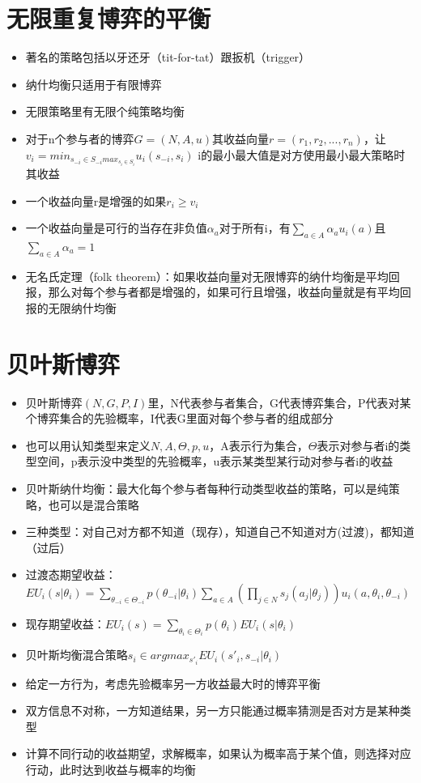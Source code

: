 \documentclass[]{book}
\providecommand{\tightlist}{%
  \setlength{\itemsep}{0pt}\setlength{\parskip}{0pt}}
\begin{document}
\section{无限重复博弈的平衡}

\begin{itemize}
\tightlist
\item
  著名的策略包括以牙还牙（tit-for-tat）跟扳机（trigger）
\item
  纳什均衡只适用于有限博弈
\item
  无限策略里有无限个纯策略均衡
\item
  对于n个参与者的博弈\(G = (N,A,u)\)其收益向量\(r = (r_1,r_2,...,r_n)\)，让\(v_i = min_{s_{-i} \in S_{-i}max_{s_i \in S_i}} u_i(s_{-i},s_i)\) i的最小最大值是对方使用最小最大策略时其收益
\item
  一个收益向量r是增强的如果\(r_i\geq v_i\)
\item
  一个收益向量是可行的当存在非负值\(\alpha_a\)对于所有i，有\(\sum_{a\in A}\alpha_au_i(a)\)且\(\sum_{a\in A}\alpha_a = 1\)
\item
  无名氏定理（folk theorem）：如果收益向量对无限博弈的纳什均衡是平均回报，那么对每个参与者都是增强的，如果可行且增强，收益向量就是有平均回报的无限纳什均衡
\end{itemize}

\section{贝叶斯博弈}

\begin{itemize}
\tightlist
\item
  贝叶斯博弈\((N,G,P,I)\)里，N代表参与者集合，G代表博弈集合，P代表对某个博弈集合的先验概率，I代表G里面对每个参与者的组成部分
\item
  也可以用认知类型来定义\(N,A,\Theta,p,u\)，A表示行为集合，\(\Theta\)表示对参与者i的类型空间，p表示没中类型的先验概率，u表示某类型某行动对参与者i的收益
\item
  贝叶斯纳什均衡：最大化每个参与者每种行动类型收益的策略，可以是纯策略，也可以是混合策略
\item
  三种类型：对自己对方都不知道（现存），知道自己不知道对方(过渡)，都知道（过后）
\item
  过渡态期望收益：\(EU_i(s|\theta_i) = \sum_{\theta_{-i}\in\Theta_{-i}}p(\theta_{-i}|\theta_i)\sum_{a\in A}(\prod_{j\in N}s_j(a_j|\theta_j))u_i(a,\theta_i,\theta_{-i})\)
\item
  现存期望收益：\(EU_i(s) = \sum_{\theta_i\in \Theta_i}p(\theta_i)EU_i(s|\theta_i)\)
\item
  贝叶斯均衡混合策略\(s_i\in arg max_{s'_i}EU_i(s'_i,s_{-i}|\theta_i)\)
\item
  给定一方行为，考虑先验概率另一方收益最大时的博弈平衡
\item
  双方信息不对称，一方知道结果，另一方只能通过概率猜测是否对方是某种类型
\item
  计算不同行动的收益期望，求解概率，如果认为概率高于某个值，则选择对应行动，此时达到收益与概率的均衡
\end{itemize}
\end{document}
